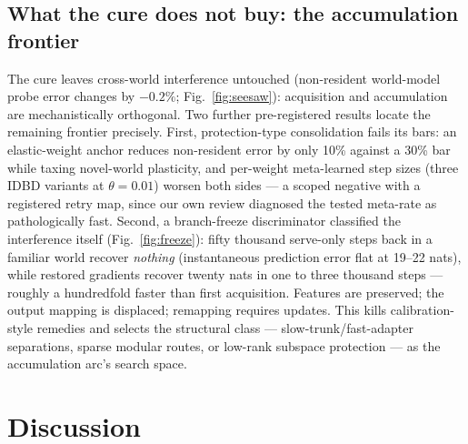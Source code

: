\documentclass[sn-nature]{sn-jnl}
\begin{document}
\subsection*{What the cure does not buy: the accumulation frontier}

The cure leaves cross-world interference untouched (non-resident world-model
probe error changes by $-0.2\%$; Fig.~\ref{fig:seesaw}): acquisition and
accumulation are mechanistically orthogonal. Two further pre-registered
results locate the remaining frontier precisely. First, protection-type
consolidation fails its bars: an elastic-weight anchor\cite{kirkpatrick2017} reduces non-resident
error by only 10\% against a 30\% bar while taxing novel-world plasticity,
and per-weight meta-learned step sizes (three IDBD\cite{sutton1992} variants at
$\theta{=}0.01$) worsen both sides --- a scoped negative with a registered
retry map, since our own review diagnosed the tested meta-rate as
pathologically fast. Second, a branch-freeze discriminator classified the
interference itself (Fig.~\ref{fig:freeze}): fifty thousand serve-only steps
back in a familiar world recover \emph{nothing} (instantaneous prediction
error flat at 19--22 nats), while restored gradients recover twenty nats in
one to three thousand steps --- roughly a hundredfold faster than first
acquisition. Features are preserved; the output mapping is displaced;
remapping requires updates. This kills calibration-style remedies and
selects the structural class --- slow-trunk/fast-adapter separations, sparse
modular routes, or low-rank subspace protection --- as the accumulation
arc's search space.

\section*{Discussion}
\end{document}
